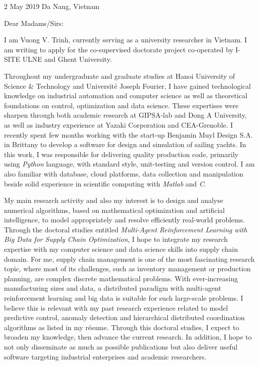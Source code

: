 \documentclass[a4paper,11pt]{article}
\begin{document}
{\hspace*{-\marginparsep minus \marginparwidth}
\begin{minipage}[t]{\textwidth+\marginparwidth+\marginparsep}
	
2 May 2019 \hfill{Da Nang, Vietnam}

\vspace{0.75cm}

Dear Madams/Sirs:

\vspace{0.3cm}

I am Vuong V. Trinh, currently serving as a university researcher in Vietnam. I am writing to apply for the co-supervised doctorate project co-operated by I-SITE ULNE and Ghent University. 

\vspace{0.3cm}

Throughout my undergraduate and graduate studies at Hanoi University of Science \& Technology and Universit\'{e} Joseph Fourier, I have gained technological knowledge on industrial automation and computer science as well as theoretical foundations on control, optimization and data science. These expertises were sharpen through both academic research at GIPSA-lab and Dong A University, as well as industry experience at Yazaki Corporation and CEA-Grenoble. I recently spent few months working with the start-up Benjamin Muyl Design S.A. in Brittany to develop a software for design and simulation of sailing yachts. In this work, I was responsible for delivering quality production code, primarily using \emph{Python} language, with standard style, unit-testing and version control. I am also familiar with database, cloud platforms, data collection and manipulation beside solid experience in scientific computing with \emph{Matlab} and \emph{C}. 

\vspace{0.3cm}

My main research activity and also my interest is to design and analyse numerical algorithms, based on mathematical optimization and artificial intelligence, to model appropriately and resolve efficiently real-world problems. Through the doctoral studies entitled \emph{Multi-Agent Reinforcement Learning with Big Data for Supply Chain Optimization}, I hope to integrate my research expertise with my computer science and data science skills into supply chain domain. For me, supply chain management is one of the most fascinating research topic, where most of its challenges, such as inventory management or production planning, are complex discrete mathematical problems. With ever-increasing manufacturing sizes and data, a distributed paradigm with multi-agent reinforcement learning and big data is suitable for such large-scale problems. I believe this is relevant with my past research experience related to model predictive control, anomaly detection and hierarchical distributed coordination algorithms as listed in my r\'{e}sume. Through this doctoral studies, I expect to broaden my knowledge, then advance the current research. In addition, I hope to not only disseminate as much as possible publications but also deliver useful software targeting industrial enterprises and academic researchers.


\end{minipage}}
\end{document}
